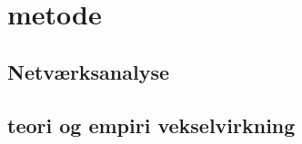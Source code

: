 
\chapter{metode} \label{metode}



\section{Netværksanalyse \label{}}




\section{teori og empiri vekselvirkning \label{kategorierogteori}}

